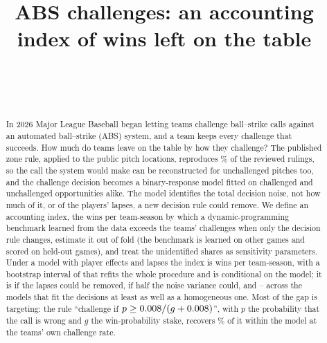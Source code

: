 \documentclass[aoas]{imsart}
\theoremstyle{plain}
\theoremstyle{definition}
\begin{document}
\nocite{Savant2026abs,SavantCSV2026,Tango2026costbenefit,Tango2026naive}

\begin{frontmatter}
\title{ABS challenges: an accounting index of wins left on the table}

\begin{aug}
\author[A]{~}
\author[A]{~}
\address[A]{Department of Probability and Mathematical Statistics, Faculty of Mathematics and Physics, Charles
University, Sokolovsk\'a 49/83, 186 00 Prague, Czech Republic}
\end{aug}

\begin{abstract}
In 2026 Major League Baseball began letting teams challenge ball--strike calls against an automated ball--strike
(ABS) system, and a team keeps every challenge that succeeds. How much do teams leave on the table by how they
challenge? The published zone rule, applied to the public pitch locations, reproduces \GeomRepro\% of the \GeomN{}
reviewed rulings, so the call the system would make can be reconstructed for unchallenged pitches too, and the
challenge decision becomes a binary-response model fitted on challenged and unchallenged opportunities alike. The model
identifies the total decision noise, not how much of it, or of the players' lapses, a new decision rule could remove.
We define an accounting index, the wins per team-season by which a dynamic-programming benchmark learned from the data
exceeds the teams' challenges when only the decision rule changes, estimate it out of fold (the benchmark is learned on other games and scored on held-out games), and treat the unidentified shares as
sensitivity parameters. Under a model with player effects and lapses the index is \Gap{} wins per team-season, with a
bootstrap interval of \GapCI{} that refits the whole procedure and is conditional on the model; it is \GapLamOne{} if the
lapses could be removed, \GapRhoHalf{} if half the noise variance could, and \PCFLo--\PCFHi{} across the models that fit
the decisions at least as well as a homogeneous one. Most of the gap is targeting: the rule ``challenge if
$p\ge0.008/(g+0.008)$'', with $p$ the probability that the call is wrong and $g$ the win-probability stake,
recovers \GapRuleGapPct\% of it within the model at the teams' own challenge rate.
\end{abstract}

\begin{keyword}[class=MSC]
\end{keyword}

\begin{keyword}
\end{keyword}

\end{frontmatter}
\end{document}
